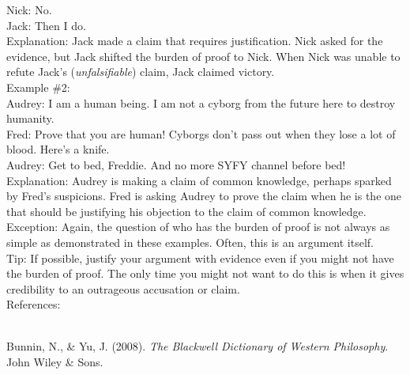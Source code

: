 \documentclass[a4paper,12pt,single,pdftex]{scrartcl}
\begin{document}
    
      Nick: No.
    \\

    
      Jack: Then I do.
    \\

    
      Explanation: Jack made a claim that requires justification. Nick asked for the evidence, but Jack shifted the burden of proof to Nick. When Nick was unable to refute Jack's ({\it unfalsifiable}) claim, Jack claimed victory.
    \\

    
      Example \#2:
    \\

    
      Audrey: I am a human being. I am not a cyborg from the future here to destroy humanity.
    \\

    
      Fred: Prove that you are human! Cyborgs don't pass out when they lose a lot of blood. Here's a knife.
    \\

    
      Audrey: Get to bed, Freddie. And no more SYFY channel before bed!
    \\

    
      Explanation: Audrey is making a claim of common knowledge, perhaps sparked by Fred's suspicions. Fred is asking Audrey to prove the claim when he is the one that should be justifying his objection to the claim of common knowledge.
    \\

    
      Exception: Again, the question of who has the burden of proof is not always as simple as demonstrated in these examples. Often, this is an argument itself.
    \\

    
      Tip: If possible, justify your argument with evidence even if you might not have the burden of proof. The only time you might not want to do this is when it gives credibility to an outrageous accusation or claim.
    \\

    References:

    
      
        
      \\

      
        
          Bunnin, N., \& Yu, J. (2008). {\it The Blackwell Dictionary of Western Philosophy}. John Wiley \& Sons.
        
      
    
  
\end{document}
